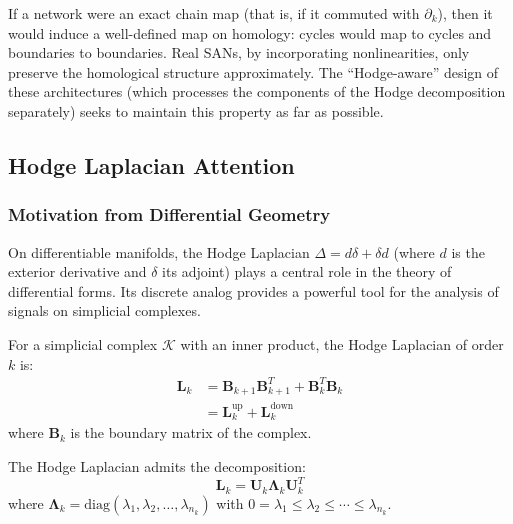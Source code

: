 \begin{remark}\label{cor:preservacion_homologia}
If a network were an exact chain map (that is, if it commuted with $\partial_k$), then it would induce a well-defined map on homology: cycles would map to cycles and boundaries to boundaries. Real SANs, by incorporating nonlinearities, only preserve the homological structure approximately. The ``Hodge-aware'' design of these architectures (which processes the components of the Hodge decomposition separately) seeks to maintain this property as far as possible.
\end{remark}

\subsection{Hodge Laplacian Attention}

\subsubsection{Motivation from Differential Geometry}

On differentiable manifolds, the Hodge Laplacian $\Delta = d \delta + \delta d$ (where $d$ is the exterior derivative and $\delta$ its adjoint) plays a central role in the theory of differential forms. Its discrete analog provides a powerful tool for the analysis of signals on simplicial complexes.

\begin{definition}\label{def:hodge_laplacian_discreto}
For a simplicial complex $\mathcal{K}$ with an inner product, the Hodge Laplacian of order $k$ is:
\begin{align}
    \mathbf{L}_k &= \mathbf{B}_{k+1} \mathbf{B}_{k+1}^T + \mathbf{B}_k^T \mathbf{B}_k \\
    &= \mathbf{L}_k^{\text{up}} + \mathbf{L}_k^{\text{down}}
\end{align}
where $\mathbf{B}_k$ is the boundary matrix of the complex.
\end{definition}

\begin{theorem}\label{thm:descomposicion_hodge_laplacian}
The Hodge Laplacian admits the decomposition:
\begin{equation}
    \mathbf{L}_k = \mathbf{U}_k \boldsymbol{\Lambda}_k \mathbf{U}_k^T
\end{equation}
where $\boldsymbol{\Lambda}_k = \text{diag}(\lambda_1, \lambda_2, \ldots, \lambda_{n_k})$ with $0 = \lambda_1 \leq \lambda_2 \leq \cdots \leq \lambda_{n_k}$.
\end{theorem}

